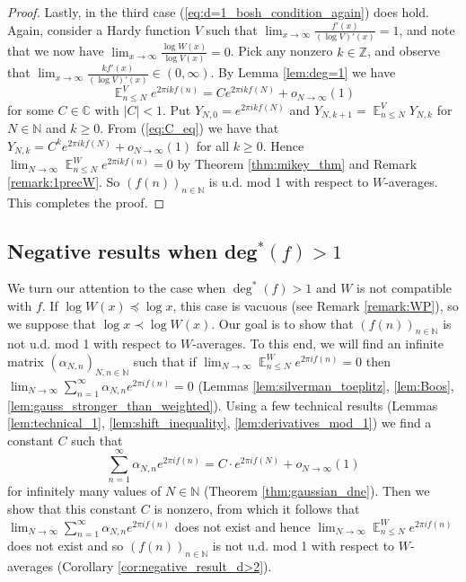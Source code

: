 \documentclass[12pt]{article}
\theoremstyle{plain} %
\theoremstyle{definition} %
\theoremstyle{plain}
\theoremstyle{plain}
\numberwithin{equation}{section}
\newcommand{\N}{\mathbb{N}}
\newcommand{\Z}{\mathbb{Z}}
\newcommand{\C}{\mathbb{C}}
\renewcommand{\leq}{\leqslant}
\renewcommand{\geq}{\geqslant}
\newcommand{\1}{\mathbbm{1}}
\newcommand{\E}{\operatorname{\mathbb{E}}}
\newcommand{\oo}{\infty}
\begin{document}
\begin{proof}
Lastly, in the third case (\ref{eq:d=1_bosh_condition_again}) does hold. Again, consider a Hardy function $V$ such that $\lim_{x\to\oo}\frac{f'(x)}{(\log V)'(x)}=1$, and note that we now have $\lim_{x\to\oo}\frac{\log {W}(x)}{\log V(x)}=0$. Pick any nonzero $k\in \Z$, and observe that $\lim_{x\to\oo}\frac{kf'(x)}{(\log V)'(x)}\in(0,\oo)$.
By Lemma \ref{lem:deg=1} we have 
\begin{equation}\label{eq:C_eq}
    \E_{n\leq N}^{V}e^{2\pi i kf(n)} = Ce^{2\pi i kf(N)}+o_{N\to\oo}(1)
\end{equation}
    for some $C\in \C$ with $|C|<1$. Put $Y_{N,0} = e^{2\pi i kf(N)}$ and $Y_{N,k+1} = \E_{n\leq N}^{V}Y_{N,k}$ for $N\in \N$ and $k\geq 0$. From (\ref{eq:C_eq}) we have that $Y_{N,k} = C^ke^{2\pi i kf(N)}+o_{N\to\oo}(1)$ for all $k\geq 0$.  Hence $\lim_{N\to\oo}\E^W_{n\leq N}e^{2\pi i kf(n)}=0$  by Theorem \ref{thm:mikey_thm} and Remark \ref{remark:1precW}. So $(f(n))_{n\in \N}$ is u.d. mod 1 with respect to $W$-averages. This completes the proof.
\end{proof}


\subsection{Negative results when deg\texorpdfstring{$^*(f)>1$}{*(f)>1}}

We turn our attention to the case when $\deg^*(f)> 1$ and $W$ is not compatible with $f$. If $\log W(x)\preceq \log x$, this case is vacuous (see Remark \ref{remark:WP}), so we suppose that $\log x\prec \log W(x)$. Our goal is to show that $(f(n))_{n\in \N}$ is not u.d. mod 1 with respect to $W$-averages. To this end, we will find an infinite matrix $(\alpha_{N,n})_{N,n\in \N}$ such that if $\lim_{N\to\oo}\E^W_{n\leq N}e^{2\pi i f(n)}=0$ then $\lim_{N\to\oo}\sum_{n=1}^{\oo}\alpha_{N,n}e^{2\pi i f(n)}=0$ (Lemmas \ref{lem:silverman_toeplitz}, \ref{lem:Boos}, \ref{lem:gauss_stronger_than_weighted}). Using a few technical results (Lemmas \ref{lem:technical_1}, \ref{lem:shift_inequality}, \ref{lem:derivatives_mod_1}) we find a constant $C$ such that 
\begin{equation}\label{eq:find_C}
   \sum_{n=1}^{\oo}\alpha_{N,n}e^{2\pi i f(n)} = C\cdot e^{2\pi if(N)}+o_{N\to\oo}(1)
\end{equation}
for infinitely many values of $N\in \N$ (Theorem \ref{thm:gaussian_dne}). Then we show that this constant $C$ is nonzero, from which it follows that $\lim_{N\to\oo}\sum_{n=1}^{\oo}\alpha_{N,n}e^{2\pi i f(n)}$ does not exist and hence $\lim_{N\to\oo}\E^W_{n\leq N}e^{2\pi if(n)}$ does not exist and so $(f(n))_{n\in \N}$ is not u.d. mod 1 with respect to $W$-averages (Corollary \ref{cor:negative_result_d>2}).
\end{document}
